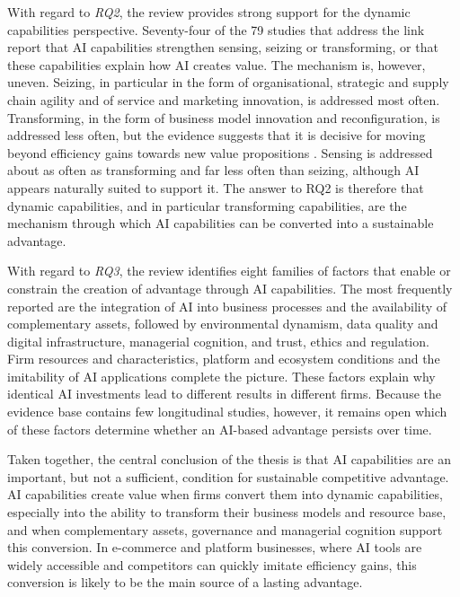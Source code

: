 With regard to \emph{RQ2}, the review provides strong support for the dynamic capabilities perspective. Seventy-four of the 79 studies that address the link report that AI capabilities strengthen sensing, seizing or transforming, or that these capabilities explain how AI creates value. The mechanism is, however, uneven. Seizing, in particular in the form of organisational, strategic and supply chain agility and of service and marketing innovation, is addressed most often. Transforming, in the form of business model innovation and reconfiguration, is addressed less often, but the evidence suggests that it is decisive for moving beyond efficiency gains towards new value propositions . Sensing is addressed about as often as transforming and far less often than seizing, although AI appears naturally suited to support it. The answer to RQ2 is therefore that dynamic capabilities, and in particular transforming capabilities, are the mechanism through which AI capabilities can be converted into a sustainable advantage.

With regard to \emph{RQ3}, the review identifies eight families of factors that enable or constrain the creation of advantage through AI capabilities. The most frequently reported are the integration of AI into business processes and the availability of complementary assets, followed by environmental dynamism, data quality and digital infrastructure, managerial cognition, and trust, ethics and regulation. Firm resources and characteristics, platform and ecosystem conditions and the imitability of AI applications complete the picture. These factors explain why identical AI investments lead to different results in different firms. Because the evidence base contains few longitudinal studies, however, it remains open which of these factors determine whether an AI-based advantage persists over time.

Taken together, the central conclusion of the thesis is that AI capabilities are an important, but not a sufficient, condition for sustainable competitive advantage. AI capabilities create value when firms convert them into dynamic capabilities, especially into the ability to transform their business models and resource base, and when complementary assets, governance and managerial cognition support this conversion. In e-commerce and platform businesses, where AI tools are widely accessible and competitors can quickly imitate efficiency gains, this conversion is likely to be the main source of a lasting advantage.

